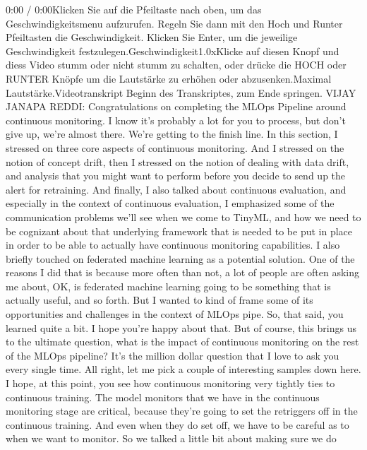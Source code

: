 {{{{{{{{    0:00 / 0:00Klicken Sie auf die Pfeiltaste nach oben, um das Geschwindigkeitsmenu aufzurufen. Regeln Sie dann mit den Hoch und Runter Pfeiltasten die Geschwindigkeit. Klicken Sie Enter, um die jeweilige Geschwindigkeit festzulegen.Geschwindigkeit1.0xKlicke auf diesen Knopf und diess Video stumm oder nicht stumm zu schalten, oder drücke die HOCH oder RUNTER Knöpfe um die Lautstärke zu erhöhen oder abzusenken.Maximal Lautstärke.Videotranskript
    Beginn des Transkriptes, zum Ende springen.
    VIJAY JANAPA REDDI: Congratulations on completing the MLOps Pipeline
    around continuous monitoring.
    I know it's probably a lot for you to process, but don't give up,
    we're almost there.
    We're getting to the finish line.
    In this section, I stressed on three core aspects of continuous monitoring.
    And I stressed on the notion of concept drift,
    then I stressed on the notion of dealing with data drift,
    and analysis that you might want to perform before you decide
    to send up the alert for retraining.
    And finally, I also talked about continuous evaluation,
    and especially in the context of continuous evaluation,
    I emphasized some of the communication problems
    we'll see when we come to TinyML, and how
    we need to be cognizant about that underlying framework that
    is needed to be put in place in order to be able to actually have
    continuous monitoring capabilities.
    I also briefly touched on federated machine
    learning as a potential solution.
    One of the reasons I did that is because more often than not, a lot of people
    are often asking me about, OK, is federated machine
    learning going to be something that is actually useful, and so forth.
    But I wanted to kind of frame some of its opportunities and challenges
    in the context of MLOps pipe.
    So, that said, you learned quite a bit.
    I hope you're happy about that.
    But of course, this brings us to the ultimate question,
    what is the impact of continuous monitoring on the rest of the MLOps
    pipeline?
    It's the million dollar question that I love to ask you every single time.
    All right, let me pick a couple of interesting samples down here.
    I hope, at this point, you see how continuous monitoring very tightly
    ties to continuous training.
    The model monitors that we have in the continuous monitoring stage
    are critical, because they're going to set the retriggers off
    in the continuous training.
    And even when they do set off, we have to be careful as
    to when we want to monitor.
    So we talked a little bit about making sure we do
}}}}}}}}
